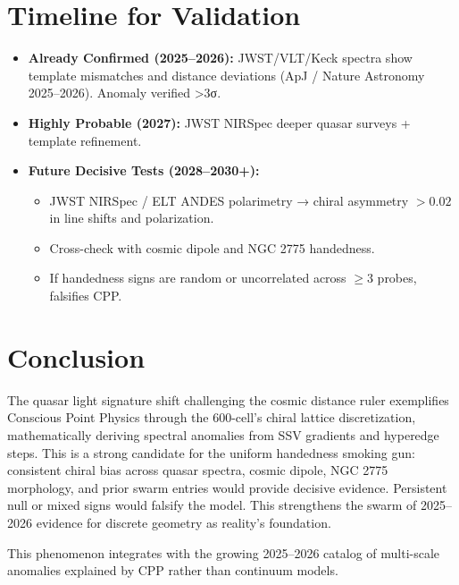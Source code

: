 \documentclass[11pt]{article}
\begin{document}
\section{Timeline for Validation}
\begin{itemize}
    \item \textbf{Already Confirmed (2025--2026):} JWST/VLT/Keck spectra show template mismatches and distance deviations (ApJ / Nature Astronomy 2025--2026). Anomaly verified >3σ.
    \item \textbf{Highly Probable (2027):} JWST NIRSpec deeper quasar surveys + template refinement.
    \item \textbf{Future Decisive Tests (2028--2030+):}
    \begin{itemize}
        \item JWST NIRSpec / ELT ANDES polarimetry → chiral asymmetry $>0.02$ in line shifts and polarization.
        \item Cross-check with cosmic dipole and NGC 2775 handedness.
        \item If handedness signs are random or uncorrelated across $\geq 3$ probes, falsifies CPP.
    \end{itemize}
\end{itemize}

\section{Conclusion}
The quasar light signature shift challenging the cosmic distance ruler exemplifies Conscious Point Physics through the 600-cell's chiral lattice discretization, mathematically deriving spectral anomalies from SSV gradients and hyperedge steps. This is a strong candidate for the uniform handedness smoking gun: consistent chiral bias across quasar spectra, cosmic dipole, NGC 2775 morphology, and prior swarm entries would provide decisive evidence. Persistent null or mixed signs would falsify the model. This strengthens the swarm of 2025--2026 evidence for discrete geometry as reality's foundation.

This phenomenon integrates with the growing 2025--2026 catalog of multi-scale anomalies explained by CPP rather than continuum models.
\end{document}
